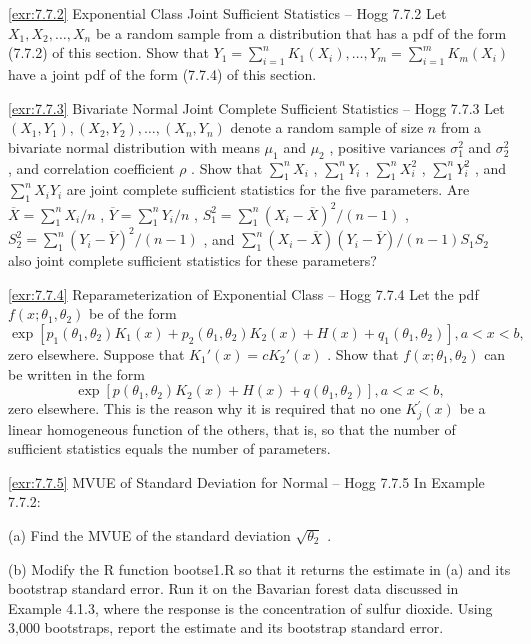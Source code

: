 \begin{exercise}{\ref{exr:7.7.2} Exponential Class Joint Sufficient Statistics – Hogg 7.7.2}\label{exr:7.7.2}
Let $X_{1}, X_{2}, \ldots, X_{n}$ be a random sample from a distribution that has a pdf of the form (7.7.2) of this section. Show that $Y_{1} = \sum_{i=1}^{n} K_{1}(X_{i}), \ldots, Y_{m} = \sum_{i=1}^{m} K_{m}(X_{i})$ have a joint pdf of the form (7.7.4) of this section.
\end{exercise}

\begin{exercise}{\ref{exr:7.7.3} Bivariate Normal Joint Complete Sufficient Statistics – Hogg 7.7.3}\label{exr:7.7.3}
Let $(X_{1},Y_{1}),(X_{2},Y_{2}),\ldots ,(X_{n},Y_{n})$ denote a random sample of size $n$ from a bivariate normal distribution with means $\mu_{1}$ and $\mu_{2}$ , positive variances $\sigma_1^2$ and $\sigma_2^2$ , and correlation coefficient $\rho$ . Show that $\sum_{1}^{n}X_{i}$ , $\sum_{1}^{n}Y_{i}$ , $\sum_{1}^{n}X_{i}^{2}$ , $\sum_{1}^{n}Y_{i}^{2}$ , and $\sum_{1}^{n}X_{i}Y_{i}$ are joint complete sufficient statistics for the five parameters. Are $\overline{X} = \sum_{1}^{n}X_{i} / n$ , $\overline{Y} = \sum_{1}^{n}Y_{i} / n$ , $S_1^2 = \sum_{1}^{n}(X_i - \overline{X})^2 /(n - 1)$ , $S_2^2 = \sum_{1}^{n}(Y_i - \overline{Y})^2 /(n - 1)$ , and $\sum_{1}^{n}(X_{i} - \overline{X})(Y_{i} - \overline{Y}) / (n - 1)S_{1}S_{2}$ also joint complete sufficient statistics for these parameters?
\end{exercise}

\begin{exercise}{\ref{exr:7.7.4} Reparameterization of Exponential Class – Hogg 7.7.4}\label{exr:7.7.4}
Let the pdf $f(x; \theta_1, \theta_2)$ be of the form
\[
\exp\left[p_1(\theta_1, \theta_2) K_1(x) + p_2(\theta_1, \theta_2) K_2(x) + H(x) + q_1(\theta_1, \theta_2)\right], a < x < b,
\]
zero elsewhere. Suppose that $K_1'(x) = cK_2'(x)$ . Show that $f(x; \theta_1, \theta_2)$ can be written in the form
\[
\exp\left[p(\theta_1, \theta_2) K_2(x) + H(x) + q(\theta_1, \theta_2)\right], a < x < b,
\]
zero elsewhere. This is the reason why it is required that no one $K_{j}^{\prime}(x)$ be a linear homogeneous function of the others, that is, so that the number of sufficient statistics equals the number of parameters.
\end{exercise}

\begin{exercise}{\ref{exr:7.7.5} MVUE of Standard Deviation for Normal – Hogg 7.7.5}\label{exr:7.7.5}
In Example 7.7.2:

(a) Find the MVUE of the standard deviation $\sqrt{\theta_2}$ .

(b) Modify the R function bootse1.R so that it returns the estimate in (a) and its bootstrap standard error. Run it on the Bavarian forest data discussed in Example 4.1.3, where the response is the concentration of sulfur dioxide. Using 3,000 bootstraps, report the estimate and its bootstrap standard error.
\end{exercise}

